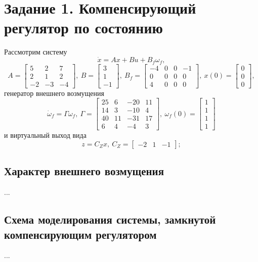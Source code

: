 \documentclass[a4paper, 12pt]{article}
\begin{document}
    \section{Задание 1. Компенсирующий регулятор по состоянию}
    Рассмотрим систему
    $$
    \dot{x}=Ax+Bu+B_f\omega_f,
    $$
    $$
    A=\begin{bmatrix}
        5 &2 &7\\
        2 &1 &2\\
        -2 &-3 &-4
    \end{bmatrix},\ B=\begin{bmatrix}
        3\\1\\-1
    \end{bmatrix},\ B_f=\begin{bmatrix}
        -4 &0 &0 &-1\\
        0 &0 &0 &0\\
        4 &0 &0 &0
    \end{bmatrix},\ x(0)=\begin{bmatrix}
        0\\0\\0
    \end{bmatrix},
    $$
    генератор внешнего возмущения
    $$
    \dot{\omega}_f=\Gamma\omega_f,\ \Gamma=\begin{bmatrix}
        25 &6 &-20 &11\\
        14 &3 &-10 &4\\
        40 &11 &-31 &17\\
        6 &4 &-4 &3
    \end{bmatrix},\ \omega_f(0)=\begin{bmatrix}
        1\\1\\1\\1
    \end{bmatrix}
    $$
    и виртуальный выход вида
    $$
    z=C_Zx,\ C_Z=\begin{bmatrix}
        -2 &1 &-1
    \end{bmatrix};
    $$

    
    \subsection{Характер внешнего возмущения}
    ...


    \subsection{Схема моделирования системы, замкнутой компенсирующим регулятором}
    ...
\end{document}
